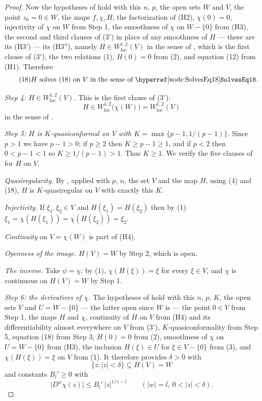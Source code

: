 \begin{proof}
Now the hypotheses of  hold with this $n$, $p$, the
open sets $W$ and $V$, the point $z_0=0\in W$, the maps $f,\chi,H$, the
factorization of (H2), $\chi(0)=0$, injectivity of $\chi$ on $W$ from Step 1,
the smoothness of $\chi$ on $W-\{0\}$ from (H3), the second and third clauses
of (3$'$) in place of any smoothness of $H$ --- these are its (H3$'$) --- its
(H3$''$), namely $H\in W^{1,2}_{\mathrm{loc}}(V)$ in the sense of
, which is the first clause of (3$'$), the two relations
(1), $H(0)=0$ from (2), and equation (12) from (H1).  Therefore
\begin{equation}\tag{18}
  H\ \text{solves (18) on }V\ \text{in the sense of \noderef{SolvesEq18}} .
\end{equation}

\emph{Step 4: $H\in W^{1,2}_{\mathrm{loc}}(V)$.}  This is the first clause of
(3$'$):
\begin{equation}\tag{4}
  H\in W^{1,2}_{\mathrm{loc}}\bigl(\chi(W)\bigr)=W^{1,2}_{\mathrm{loc}}(V)
\end{equation}
in the sense of .

\emph{Step 5: $H$ is $K$-quasiconformal on $V$ with
$K=\max\{p-1,1/(p-1)\}$.}  Since $p>1$ we have $p-1>0$; if $p\ge2$ then
$K\ge p-1\ge1$, and if $p<2$ then $0<p-1<1$ so $K\ge1/(p-1)>1$.  Thus
$K\ge1$.  We verify the five clauses of  for $H$ on
$V$.

\emph{Quasiregularity.}  By , applied with
$p$, $n$, the set $V$ and the map $H$, using (4) and (18), $H$ is
$K$-quasiregular on $V$ with exactly this $K$.

\emph{Injectivity.}  If $\xi_1,\xi_2\in V$ and $H(\xi_1)=H(\xi_2)$ then by (1)
$\xi_1=\chi(H(\xi_1))=\chi(H(\xi_2))=\xi_2$.

\emph{Continuity} on $V=\chi(W)$ is part of (H4).

\emph{Openness of the image.}  $H(V)=W$ by Step 2, which is open.

\emph{The inverse.}  Take $\psi=\chi$: by (1), $\chi(H(\xi))=\xi$ for every
$\xi\in V$, and $\chi$ is continuous on $H(V)=W$ by Step 1.

\emph{Step 6: the derivatives of $\chi$.}  The hypotheses of
 hold with this $n$, $p$, $K$, the open sets $V$
and $U=W-\{0\}$ --- the latter open since $W$ is --- the point $0\in V$ from
Step 1, the maps $H$ and $\chi$, continuity of $H$ on $V$ from (H4) and its
differentiability almost everywhere on $V$ from (3$'$),
$K$-quasiconformality from Step 5, equation (18) from
Step 3, $H(0)=0$ from (2), smoothness of $\chi$ on $U=W-\{0\}$ from (H3), the
inclusion $H(\xi)\in U$ for $\xi\in V-\{0\}$ from (3), and
$\chi(H(\xi))=\xi$ on $V$ from (1).  It therefore provides $\delta>0$ with
\begin{equation}\tag{5}
  \{z:|z|<\delta\}\subseteq H(V)=W
\end{equation}
and constants $B_l'\ge0$ with
\begin{equation}\tag{6}
  \bigl|D^{w}\chi(z)\bigr|\le B_l'\,|z|^{1/\gamma-l}
  \qquad(|w|=l,\ 0<|z|<\delta).
\end{equation}


\end{proof}
